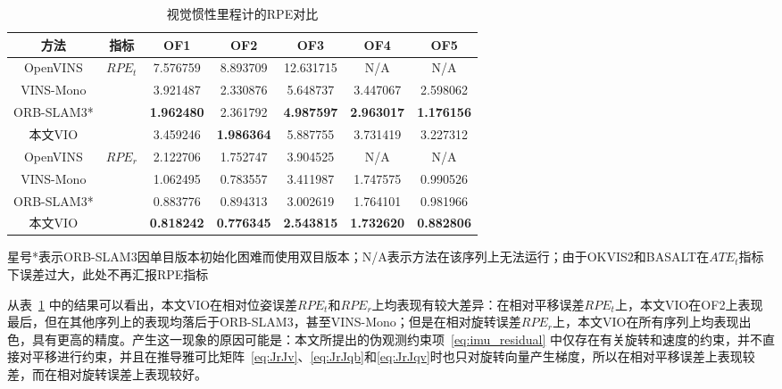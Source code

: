 \begin{table}[]
\centering
\caption{视觉惯性里程计的RPE\textdownarrow{}对比}
\begin{tabular}{ccccccc}
\toprule
方法        & 指标                    & OF1               & OF2               & OF3               & OF4               & OF5               \\ \midrule
OpenVINS  & \multirow{4}{*}{$RPE_t$} & 7.576759          & 8.893709          & 12.631715         & N/A               & N/A               \\
VINS-Mono &                       & 3.921487          & 2.330876          & 5.648737          & 3.447067          & 2.598062          \\
ORB-SLAM3* &                       & \cellcolor[HTML]{FA7F6F}\textbf{1.962480} & 2.361792          & \cellcolor[HTML]{FA7F6F}\textbf{4.987597} & \cellcolor[HTML]{FA7F6F}\textbf{2.963017} & \cellcolor[HTML]{FA7F6F}\textbf{1.176156} \\
本文VIO      &                       & 3.459246          & \cellcolor[HTML]{FA7F6F}\textbf{1.986364} & 5.887755          & 3.731419          & 3.227312          \\ \midrule
OpenVINS  & \multirow{4}{*}{$RPE_r$} & 2.122706          & 1.752747          & 3.904525          & N/A               & N/A               \\
VINS-Mono &                       & 1.062495          & 0.783557          & 3.411987          & 1.747575          & 0.990526          \\
ORB-SLAM3* &                       & 0.883776          & 0.894313          & 3.002619          & 1.764101          & 0.981966          \\
本文VIO       &                       & \cellcolor[HTML]{FA7F6F}\textbf{0.818242} & \cellcolor[HTML]{FA7F6F}\textbf{0.776345} & \cellcolor[HTML]{FA7F6F}\textbf{2.543815} & \cellcolor[HTML]{FA7F6F}\textbf{1.732620} & \cellcolor[HTML]{FA7F6F}\textbf{0.882806} \\ \bottomrule
\end{tabular}
\label{tab:vio_rpe}
\begin{tablenotes}
  \footnotesize
  \item 星号*表示ORB-SLAM3因单目版本初始化困难而使用双目版本；N/A表示方法在该序列上无法运行；由于OKVIS2和BASALT在$ATE_t$指标下误差过大，此处不再汇报RPE指标
\end{tablenotes}
\end{table}

从表~\ref{tab:vio_rpe} 中的结果可以看出，本文VIO在相对位姿误差$RPE_t$和$RPE_r$上均表现有较大差异：在相对平移误差$RPE_t$上，本文VIO在OF2上表现最后，但在其他序列上的表现均落后于ORB-SLAM3，甚至VINS-Mono；但是在相对旋转误差$RPE_r$上，本文VIO在所有序列上均表现出色，具有更高的精度。产生这一现象的原因可能是：本文所提出的伪观测约束项~\eqref{eq:imu_residual} 中仅存在有关旋转和速度的约束，并不直接对平移进行约束，并且在推导雅可比矩阵~\eqref{eq:JrJv}、\eqref{eq:JrJqb}和\eqref{eq:JrJqv}时也只对旋转向量产生梯度，所以在相对平移误差上表现较差，而在相对旋转误差上表现较好。

